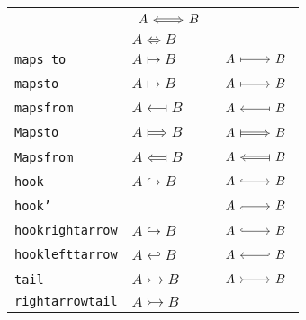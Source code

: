 \documentclass{scrartcl}
\newcommand{\tipname}{\texttt}
\begin{document}
\begin{longtable}{l@{\qquad}l@{\qquad}l}
	&
	$\begin{tikzcd} A \arrow[Leftrightarrow]{r} & B \end{tikzcd}$
	\\
	{}
	&
	$A \iff B$
	&
	{}
	\\
	\midrule
	\tipname{maps to}
	&
	$A \longmapsto B$
	&
	$\begin{tikzcd} A \arrow[maps to]{r} & B \end{tikzcd}$
	\\
	\tipname{mapsto}
	&
	$A \longmapsto B$
	&
	$\begin{tikzcd} A \arrow[mapsto]{r} & B \end{tikzcd}$
	\\
	\tipname{mapsfrom}
	&
	$A \longmapsfrom B$
	&
	$\begin{tikzcd} A \arrow[mapsfrom]{r} & B \end{tikzcd}$
	\\
	\tipname{Mapsto}
	&
	$A \Longmapsto B$
	&
	$\begin{tikzcd} A \arrow[Mapsto]{r} & B \end{tikzcd}$
	\\
	\tipname{Mapsfrom}
	&
	$A \Longmapsfrom B$
	&
	$\begin{tikzcd} A \arrow[Mapsfrom]{r} & B \end{tikzcd}$
	\\
	\midrule
	\tipname{hook}
	&
	$A \hookrightarrow B$
	&
	$\begin{tikzcd} A \arrow[hook]{r} & B \end{tikzcd}$
	\\
	\tipname{hook'}
	&
	{}
	&
	$\begin{tikzcd} A \arrow[hook']{r} & B \end{tikzcd}$
	\\
	\tipname{hookrightarrow}
	&
	$A \hookrightarrow B$
	&
	$\begin{tikzcd} A \arrow[hookrightarrow]{r} & B \end{tikzcd}$
	\\
	\tipname{hooklefttarrow}
	&
	$A \hookleftarrow  B$
	&
	$\begin{tikzcd} A \arrow[hookleftarrow]{r} & B \end{tikzcd}$
	\\
	\midrule
	\tipname{tail}
	&
	$A \rightarrowtail B$
	&
	$\begin{tikzcd} A \arrow[tail]{r} & B \end{tikzcd}$
	\\
	\tipname{rightarrowtail}
	&
	$A \rightarrowtail B$
	&

\end{longtable}
\end{document}
